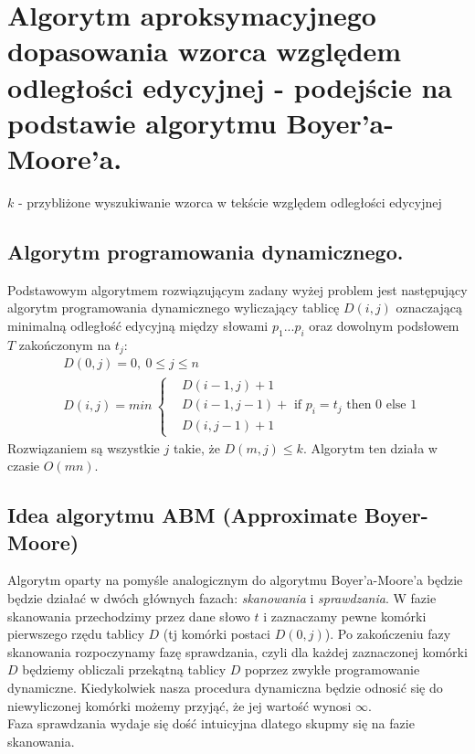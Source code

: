\section{Algorytm aproksymacyjnego dopasowania wzorca względem odległości edycyjnej - podejście na podstawie algorytmu Boyer'a-Moore'a.}

\begin{algorithm}[H]
    \caption{$k$ - przybliżone wyszukiwanie wzorca w tekście względem odległości edycyjnej}
\end{algorithm}

\subsection{Algorytm programowania dynamicznego.}
Podstawowym algorytmem rozwiązującym zadany wyżej problem jest następujący algorytm programowania dynamicznego wyliczający tablicę $D(i,j)$ oznaczającą minimalną odległość edycyjną między słowami $p_1...p_i$ oraz dowolnym podsłowem $T$ zakończonym na $t_j$:
\begin{align*}
    & D(0,j) = 0,\ 0 \leq j \leq n \\
    & D(i, j) = min\ \left\{\begin{array}{ll}
         &  D(i-1,j)+1\\
         &  D(i-1,j-1) + \text{ if } p_i = t_j \text{ then } 0 \text{ else } 1 \\
         &  D(i, j-1)+1
    \end{array} \right.
\end{align*}
Rozwiązaniem są wszystkie $j$ takie, że $D(m,j) \leq k$. Algorytm ten działa w czasie $O(mn)$.

\subsection{Idea algorytmu ABM (Approximate Boyer-Moore)}

Algorytm oparty na pomyśle analogicznym do algorytmu Boyer'a-Moore'a będzie będzie działać w dwóch głównych fazach: \textit{skanowania} i \textit{sprawdzania}.
W fazie skanowania przechodzimy przez dane słowo $t$ i zaznaczamy pewne komórki pierwszego rzędu tablicy $D$ (tj komórki postaci $D(0,j)$).
Po zakończeniu fazy skanowania rozpoczynamy fazę sprawdzania, czyli dla każdej zaznaczonej komórki $D$ będziemy obliczali przekątną tablicy $D$ poprzez zwykłe programowanie dynamiczne.
Kiedykolwiek nasza procedura dynamiczna będzie odnosić się do niewyliczonej komórki możemy przyjąć, że jej wartość wynosi $\infty.$\\
Faza sprawdzania wydaje się dość intuicyjna dlatego skupmy się na fazie skanowania.\\

